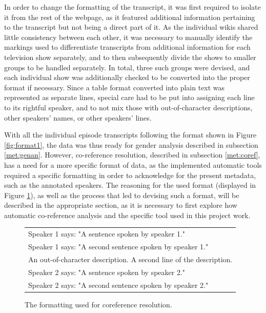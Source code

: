 \documentclass[a4paper, 11pt]{article}
\begin{document}
In order to change the formatting of the transcript, it was first required to isolate it from the rest of the webpage, as it featured additional information pertaining to the transcript but not being a direct part of it. As the individual wikis shared little consistency between each other, it was necessary to manually identify the markings used to differentiate transcripts from additional information for each television show separately, and to then subsequently divide the shows to smaller groups to be handled separately. In total, three such groups were devised, and each individual show was additionally checked to be converted into the proper format if necessary. Since a table format converted into plain text was represented as separate lines, special care had to be put into assigning each line to its rightful speaker, and to not mix those with out-of-character descriptions, other speakers' names, or other speakers' lines.

With all the individual episode transcripts following the format shown in Figure \ref{fig:format1}, the data was thus ready for gender analysis described in subsection \ref{met:genan}. However, co-reference resolution, described in subsection \ref{met:coref}, has a need for a more specific format of data, as the implemented automatic tools required a specific formatting in order to acknowledge for the present metadata, such as the annotated speakers. The reasoning for the used format (displayed in Figure \ref{fig:formatcoref}), as well as the process that led to devising such a format, will be described in the appropriate section, as it is necessary to first explore how automatic co-reference analysis and the specific tool used in this project work.

\begin{figure}[h!]
  \centering
  \begin{small}
  \begin{tabular}{l}
  Speaker 1 says: "A sentence spoken by speaker 1." \\
  Speaker 1 says: "A second sentence spoken by speaker 1." \\
  An out-of-character description. A second line of the description. \\
  Speaker 2 says: "A sentence spoken by speaker 2." \\
  Speaker 2 says: "A second sentence spoken by speaker 2." \\
  \end{tabular}
  \end{small}
  \caption{The formatting used for coreference resolution.}
  \label{fig:formatcoref}
\end{figure}
\end{document}
